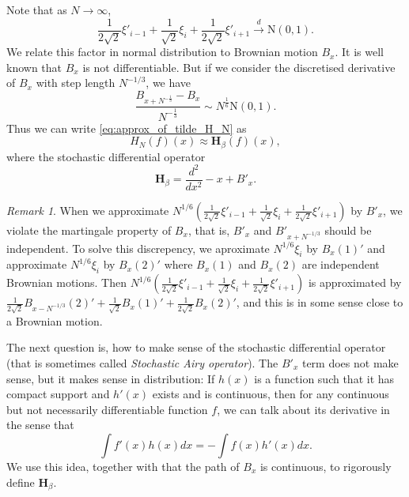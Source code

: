 \documentclass[11pt, a4paper]{article}
\numberwithin{equation}{section}
\newcommand{\todistr}{\stackrel{d}{\rightarrow}}
\newcommand{\Normal}{\mathrm{N}}
\newcommand{\Hbeta}{\mathbf{H}_{\beta}}
\theoremstyle{definition}
\theoremstyle{remark}
\newtheorem{rmk}{Remark}
\begin{document}
Note that as $N \to \infty$,
\begin{equation}
  \frac{1}{2\sqrt{2}} \xi'_{i - 1} + \frac{1}{\sqrt{2}} \xi_i + \frac{1}{2\sqrt{2}} \xi'_{i + 1} \todistr \Normal(0, 1).
\end{equation}
We relate this factor in normal distribution to Brownian motion $B_x$. It is well known that $B_x$ is not differentiable. But if we consider the discretised derivative of $B_x$ with step length $N^{-1/3}$, we have
\begin{equation}
  \frac{B_{x + N^{-\frac{1}{3}}} - B_x}{N^{-\frac{1}{3}}} \sim N^{\frac{1}{6}} \Normal(0, 1).
\end{equation}
Thus we can write \eqref{eq:approx_of_tilde_H_N} as
\begin{equation}
  H_N(f)(x) \approx \Hbeta(f)(x),
\end{equation}
where the stochastic differential operator
\begin{equation}
  \Hbeta = \frac{d^2}{d x^2} - x + B'_x.
\end{equation}
\begin{rmk}
  When we approximate $N^{1/6} (\frac{1}{2\sqrt{2}} \xi'_{i - 1} + \frac{1}{\sqrt{2}} \xi_i + \frac{1}{2\sqrt{2}} \xi'_{i + 1})$ by $B'_x$, we violate the martingale property of $B_x$, that is, $B'_x$ and $B'_{x + N^{-1/3}}$ should be independent. To solve this discrepency, we aproximate $N^{1/6} \xi_i$ by $B_x(1)'$ and approximate $N^{1/6} \xi_i$ by $B_x(2)'$ where $B_x(1)$ and $B_x(2)$ are independent Brownian motions. Then $N^{1/6} (\frac{1}{2\sqrt{2}} \xi'_{i - 1} + \frac{1}{\sqrt{2}} \xi_i + \frac{1}{2\sqrt{2}} \xi'_{i + 1})$ is approximated by $\frac{1}{2\sqrt{2}} B_{x - N^{-1/3}}(2)' + \frac{1}{\sqrt{2}} B_x(1)' + \frac{1}{2\sqrt{2}} B_x(2)'$, and this is in some sense close to a Brownian motion.
\end{rmk}

The next question is, how to make sense of the stochastic differential operator (that is sometimes called \emph{Stochastic Airy operator}). The $B'_x$ term does not make sense, but it makes sense in distribution: If $h(x)$ is a function such that it has compact support and $h'(x)$ exists and is continuous, then for any continuous but not necessarily differentiable function $f$, we can talk about its derivative in the sense that
\begin{equation}
  \int f'(x) h(x) dx = - \int f(x) h'(x) dx.
\end{equation}
We use this idea, together with that the path of $B_x$ is continuous, to rigorously define $\Hbeta$.
\end{document}

